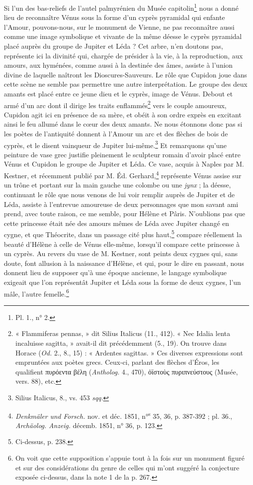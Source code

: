 \documentclass{article}
\begin{document}
Si l'un des bas-reliefs de l'autel palmyrénien du Musée capitolin\footnote{Pl. 1., n° 2.} nous a donné lieu de reconnaître Vénus sous la forme d'un cyprès pyramidal qui enfante l'Amour, pouvons-nous, sur le monument de Vienne, ne pas reconnaître aussi comme une image symbolique et vivante de la même déesse le cyprès pyramidal placé auprès du groupe de Jupiter et Léda ? Cet arbre, n'en doutons pas, représente ici la divinité qui, chargée de présider à la vie, à la reproduction, aux amours, aux hyménées, comme aussi à la destinée des âmes, assiste à l'union divine de laquelle naîtront les Dioscures-Sauveurs. Le rôle que Cupidon joue dans cette scène ne semble pas permettre une autre interprétation. Le groupe des deux amants est placé entre ce jeune dieu et le cyprès, image de Vénus. Debout et armé d'un arc dont il dirige les traits enflammés\footnote{« Flammiferas pennas, » dit Silius Italicus (11., 412). « Nec Idalia lenta incaluisse sagitta, » avait-il dit précédemment (5., 19). On trouve dans Horace (\emph{Od.} 2., 8., 15) : « Ardentes sagittas. » Ces diverses expressions sont empruntées aux poètes grecs. Ceux-ci, parlant des flèches d'Éros, les qualifient \textgreek{πυρόεντα βέλη} (\emph{Antholog.} 4., 470), \textgreek{ὀϊστοὺς πυριπνεύστους} (Musée, vers. 88), etc.} vers le couple amoureux, Cupidon agit ici en présence de sa mère, et obéit à son ordre exprès en excitant ainsi le feu allumé dans le cœur des deux amants. Ne nous étonnons donc pas si les poètes de l'antiquité donnent à l'Amour un arc et des flèches de bois de cyprès, et le disent vainqueur de Jupiter lui-même.\footnote{Silius Italicus, 8., vs. 453 \emph{sqq.}} Et remarquons qu'une peinture de vase grec justifie pleinement le sculpteur romain d'avoir placé entre Vénus et Cupidon le groupe de Jupiter et Léda. Ce vase, acquis à Naples par M. Kestner, et récemment publié par M. Éd. Gerhard,\footnote{\emph{Denkmäler und Forsch.} nov. et déc. 1851, n°\textsuperscript{s} 35, 36, p. 387-392 ; pl. 36., \emph{Archäolog. Anzeig.} décemb. 1851, n° 36, p. 123.} représente Vénus assise sur un trône et portant sur la main gauche une colombe ou une \emph{jynx} ; la déesse, continuant le rôle que nous venons de lui voir remplir auprès de Jupiter et de Léda, assiste à l'entrevue amoureuse de deux personnages que mon savant ami prend, avec toute raison, ce me semble, pour Hélène et Pâris. N'oublions pas que cette princesse était née des amours mêmes de Léda avec Jupiter changé en cygne, et que Théocrite, dans un passage cité plus haut,\footnote{Ci-dessus, p. 238.} compare réellement la beauté d'Hélène à celle de Vénus elle-même, lorsqu'il compare cette princesse à un cyprès. Au revers du vase de M. Kestner, sont peints deux cygnes qui, sans doute, font allusion à la naissance d'Hélène, et qui, pour le dire en passant, nous donnent lieu de supposer qu'à une époque ancienne, le langage symbolique exigeait que l'on représentât Jupiter et Léda sous la forme de deux cygnes, l'un mâle, l'autre femelle.\footnote{On voit que cette supposition s'appuie tout à la fois sur un monument figuré et sur des considérations du genre de celles qui m'ont suggéré la conjecture exposée ci-dessus, dans la note 1 de la p. 267.}
\end{document}
